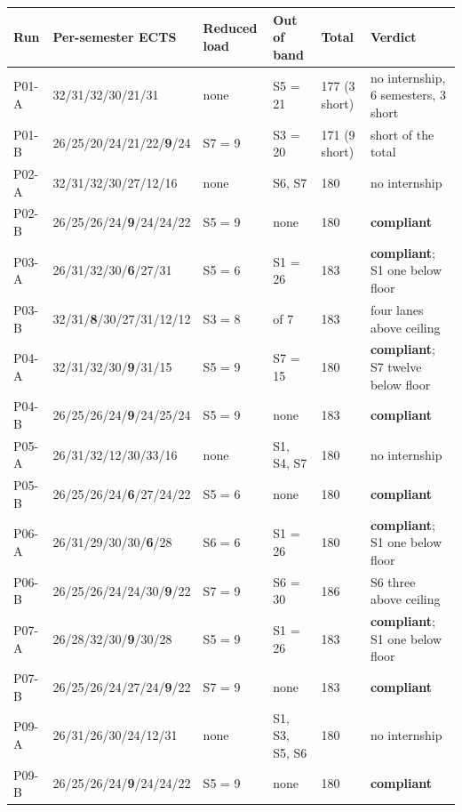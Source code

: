 \begin{table}[htpb]
    \centering
    \scriptsize
    \setlength{\tabcolsep}{4pt}
    \begin{tabular}{@{}l p{3.6cm} l >{\raggedright\arraybackslash}p{1.8cm} l >{\raggedright\arraybackslash}p{2.5cm}@{}}
        \toprule
        Run & Per-semester ECTS & Reduced load & Out of band & Total & Verdict \\
        \midrule
        P01-A & 32/31/32/30/21/31 & none & S5 = 21 & 177 (3 short) & no internship, 6 semesters, 3 short \\
        P01-B & 26/25/20/24/21/22/\textbf{9}/24 & S7 = 9 & S3 = 20 & 171 (9 short) & 9 short of the total \\
        P02-A & 32/31/32/30/27/12/16 & none & S6, S7 & 180 & no internship \\
        P02-B & 26/25/26/24/\textbf{9}/24/24/22 & S5 = 9 & none & 180 & \textbf{compliant} \\
        P03-A & 26/31/32/30/\textbf{6}/27/31 & S5 = 6 & S1 = 26 & 183 & \textbf{compliant}; S1 one below floor \\
        P03-B & 32/31/\textbf{8}/30/27/31/12/12 & S3 = 8 & 6 of 7 & 183 & four lanes above ceiling \\
        P04-A & 32/31/32/30/\textbf{9}/31/15 & S5 = 9 & S7 = 15 & 180 & \textbf{compliant}; S7 twelve below floor \\
        P04-B & 26/25/26/24/\textbf{9}/24/25/24 & S5 = 9 & none & 183 & \textbf{compliant} \\
        P05-A & 26/31/32/12/30/33/16 & none & S1, S4, S7 & 180 & no internship \\
        P05-B & 26/25/26/24/\textbf{6}/27/24/22 & S5 = 6 & none & 180 & \textbf{compliant} \\
        P06-A & 26/31/29/30/30/\textbf{6}/28 & S6 = 6 & S1 = 26 & 180 & \textbf{compliant}; S1 one below floor \\
        P06-B & 26/25/26/24/24/30/\textbf{9}/22 & S7 = 9 & S6 = 30 & 186 & S6 three above ceiling \\
        P07-A & 26/28/32/30/\textbf{9}/30/28 & S5 = 9 & S1 = 26 & 183 & \textbf{compliant}; S1 one below floor \\
        P07-B & 26/25/26/24/27/24/\textbf{9}/22 & S7 = 9 & none & 183 & \textbf{compliant} \\
        P09-A & 26/31/26/30/24/12/31 & none & S1, S3, S5, S6 & 180 & no internship \\
        P09-B & 26/25/26/24/\textbf{9}/24/24/22 & S5 = 9 & none & 180 & \textbf{compliant} \\

\end{tabular}
\end{table}
